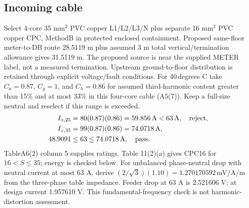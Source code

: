 \documentclass[11pt]{article}
\begin{document}
\subsection*{Incoming cable}
Select 4-core 35 mm$^2$ PVC copper L1/L2/L3/N plus separate 16 mm$^2$ PVC copper CPC, MethodB in protected enclosed containment. Proposed same-floor meter-to-DB route 28.5119 m plus assumed 3 m total vertical/termination allowance gives 31.5119 m. The proposed source is near the supplied METER label, not a measured termination. Upstream ground-to-floor distribution is retained through explicit voltage/fault conditions.
For 40\,degrees C take $C_a=0.87$, $C_g=1$, and $C_h=0.86$ for assumed third-harmonic content greater than 15\% and at most 33\% in this four-core cable (A5(7)). Keep a full-size neutral and reselect if this range is exceeded.
\begin{align*}
I_{z,25}&=80(0.87)(0.86)=59.856\,{\rm A}<63\,{\rm A},\quad\text{reject},\\
I_{z,35}&=99(0.87)(0.86)=74.0718\,{\rm A},\\
48.9091&\le63\le74.0718\,{\rm A},\quad\text{pass}.
\end{align*}
TableA6(2) column 5 supplies ratings. Table 11(2)(a) gives CPC16 for $16<S\le 35$;  energy is checked below. For unbalanced phase-neutral drop with neutral current at most 63 A, derive $(2/\sqrt 3)(1.10)=1.270170592$\,mV/A/m from the three-phase table impedance. Feeder drop at 63 A is 2.521606 V;  at design current 1.957610 V. This fundamental-frequency check is not harmonic-distortion assessment.
\end{document}
